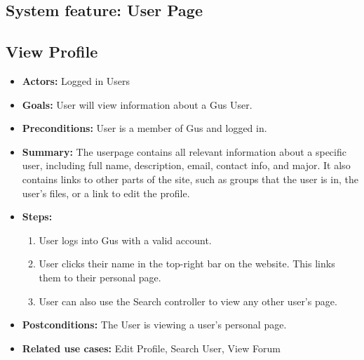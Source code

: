 \subsection{System feature: User Page}
\subsection{View Profile}
  \begin{itemize}
          \item{\textbf{Actors:} Logged in Users}
          \item{\textbf{Goals:} User will view information about a Gus User.}
          \item{\textbf{Preconditions:} User is a member of Gus and logged in.}
          \item{\textbf{Summary:} The userpage contains all relevant information about a specific user, including full name, description, email, contact info, and major. It also contains links to other parts of the site, such as groups that the user is in, the user's files, or a link to edit the profile. }
	  \item{\textbf{Steps:}}
	  \begin{enumerate}
	       \item{User logs into Gus with a valid account.}
	       \item{User clicks their name in the top-right bar on the website. This links them to their personal page.}
	       \item{User can also use the Search controller to view any other user's page.}
	  \end{enumerate}
	  \item{\textbf{Postconditions:} The User is viewing a user's personal page.}
	  \item{\textbf{Related use cases:} Edit Profile, Search User, View Forum}
     \end{itemize}
